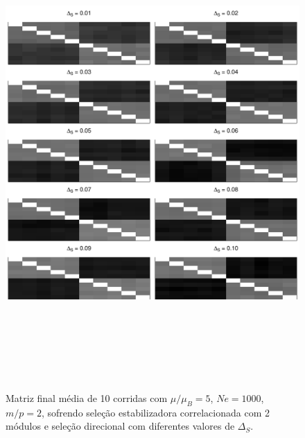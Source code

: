 \begin{center}
\begin{figure}[htbp]
  \includegraphics[width=150mm, height=180mm]{figuras/MatBDirecionalIntSel110}
   \caption{Matriz final média de 10 corridas com
   $\mu/\mu_B = 5$, $Ne = 1000$, $m/p=2$, sofrendo seleção estabilizadora correlacionada com 2
   módulos e seleção direcional com diferentes valores de $\Delta_S$.}
  \label{MatBIntSel110}
\end{figure}
\end{center}

